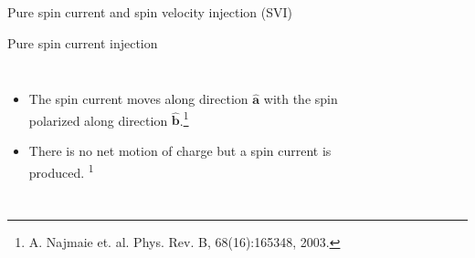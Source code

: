 \documentclass{beamer}
\begin{document}
\begin{frame}

\vspace{-0.2cm}

\noindent\makebox[\linewidth]{\rule{\linewidth}{0.4pt}}

\vspace{-2.0mm}
\begin{center}
{\large Pure spin current and spin velocity injection (SVI)}
\end{center}

\vspace{-6mm}
\noindent\makebox[\linewidth]{\rule{\linewidth}{0.4pt}}

\vspace{3mm}
{\Large Pure spin current injection}

\vspace{-4mm}
\begin{columns}


{\small


\begin{itemize}

\item 
The spin current moves along direction $\mathbf{\hat{a}}$ with the spin
polarized along direction $\mathbf{\hat{b}}$.\footnote[frame]{\tiny A. Najmaie
et. al. Phys. Rev. B, 68(16):165348, 2003.}

\item 
There is no net motion of charge but a spin current is produced.
\textsuperscript{1}

\end{itemize}
}


\begin{figure}[h!]
\end{figure}
\end{columns}
\end{frame}
\end{document}
